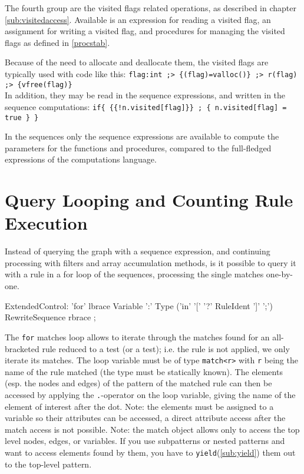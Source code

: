 The fourth group are the visited flags related operations,
as described in chapter \ref{sub:visitedaccess}.
Available is an expression for reading a visited flag, an assignment for writing a visited flag, and procedures for managing the visited flags as defined in \ref{procstab}.

\begin{example}
Because of the need to allocate and deallocate them, the visited flags are typically used with code like this:
\verb#flag:int ;> {(flag)=valloc()} ;> r(flag) ;> {vfree(flag)}#\\
In addition, they may be read in the sequence expressions, and written in the sequence computations:
\verb#if{ {{!n.visited[flag]}} ; { n.visited[flag] = true } }#
\end{example}

In the sequences only the sequence expressions are available to compute the parameters for the functions and procedures, compared to the full-fledged expressions of the computations language.



\section{Query Looping and Counting Rule Execution}

Instead of querying the graph with a sequence expression, and continuing processing with filters and array accumulation methods, is it possible to query it with a rule in a for loop of the sequences, processing the single matches one-by-one.

\begin{rail}
  ExtendedControl:
    'for' lbrace Variable ':' Type
    ('in' '[' '?' RuleIdent ']' ';')\\
    RewriteSequence rbrace
    ;
\end{rail}\label{formatch}

The \texttt{for} matches loop allows to iterate through the matches found for an all-bracketed rule reduced to a test (or a test); i.e. the rule is not applied, we only iterate its matches.
The loop variable must be of type \texttt{match<r>} with \texttt{r} being the name of the rule matched (the type must be statically known).
The elements (esp. the nodes and edges) of the pattern of the matched rule can then be accessed by applying the \texttt{.}-operator on the loop variable, giving the name of the element of interest after the dot.
Note: the elements must be assigned to a variable so their attributes can be accessed, a direct attribute access after the match access is not possible.
Note: the match object allows only to access the top level nodes, edges, or variables.
If you use subpatterns or nested patterns and want to access elements found by them, you have to \texttt{yield}(\ref{sub:yield}) them out to the top-level pattern.

